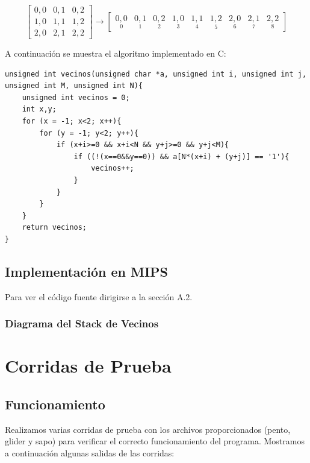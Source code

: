 \documentclass[11pt,a4paper]{article}
\begin{document}
\begin{equation*}
\begin{bmatrix}
0,0 & 0,1 & 0,2 \\
1,0 & 1,1 & 1,2 \\
2,0 & 2,1 & 2,2
\end{bmatrix}
\rightarrow 
\begin{bmatrix}
\underset{0}{0,0} & \underset{1}{0,1} & \underset{2}{0,2} & \underset{3}{1,0} & \underset{4}{1,1} & \underset{5}{1,2} & \underset{6}{2,0} & \underset{7}{2,1} & \underset{8}{2,2}
\end{bmatrix}
\end{equation*}

A continuación se muestra el algoritmo implementado en C:

\begin{lstlisting}[caption={Código de la funcion vecinos},label={lst:codigoc}]
unsigned int vecinos(unsigned char *a, unsigned int i, unsigned int j, unsigned int M, unsigned int N){
	unsigned int vecinos = 0;
	int x,y;
	for (x = -1; x<2; x++){
		for (y = -1; y<2; y++){
			if (x+i>=0 && x+i<N && y+j>=0 && y+j<M){
				if ((!(x==0&&y==0)) && a[N*(x+i) + (y+j)] == '1'){
					vecinos++;
				}
			}
		}
	}
	return vecinos;
}
\end{lstlisting}

\subsection{Implementación en MIPS}

Para ver el código fuente dirigirse a la sección A.2.

\subsubsection{Diagrama del Stack de Vecinos}

\section{Corridas de Prueba}

\subsection{Funcionamiento}
Realizamos varias corridas de prueba con los archivos proporcionados (pento, glider y sapo) para verificar el correcto funcionamiento del programa. Mostramos a continuación algunas salidas de las corridas:
\end{document}

